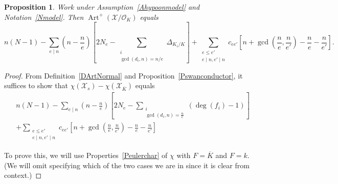 \documentclass[12pt]{amsart}
\numberwithin{equation}{section}
\newtheorem{prop}[equation]{Proposition}
\theoremstyle{definition}
\newcommand{\mc}[1]{\mathcal{#1}}
\DeclareMathOperator{\cha}{char}
\DeclareMathOperator{\Art}{Art}
\begin{document}
\begin{prop}\label{PartinNormalcalculation} Work under Assumption~\ref{Ahypoonmodel} and Notation~\ref{Nmodel}.
  Then $\Art^+(\mc{X}/\mc{O}_K)$ equals
$$ n \left(N-1 \right)-\sum_{e \mid n} \left(n-\frac{n}{e} \right) \left[2N_e -  \sum_{\substack{i \\ \gcd(d_i,n) = n/e}} \Delta_{K_i/K} \right]+\sum_{\substack{e \leq e' \\ e \mid n, e' \mid n}} c_{ee'} \left[ n+\gcd \left(\frac{n}{e},\frac{n}{e'} \right)-\frac{n}{e}-\frac{n}{e'} \right].$$
\end{prop}
\begin{proof}
From Definition~\ref{DArtNormal} and Proposition~\ref{Pswanconductor}, it suffices to show that $\chi(\mc{X}_s)-\chi(\mc{X}_{\overline{K}})$ equals
\begin{equation}\label{Etoprove}
\begin{aligned}
n \left(N-1 \right)-\sum_{e \mid n} \left(n-\frac{n}{e} \right) \left[2N_e -  \sum_{\substack{i \\ \gcd(d_i,n) = \frac{n}{e}}} (\deg(f_i)-1) \right]
\\+\sum_{\substack{e \leq e' \\ e \mid n, e' \mid n}} c_{ee'} \left[ n+\gcd \left(\frac{n}{e},\frac{n}{e'} \right)-\frac{n}{e}-\frac{n}{e'} \right] 
\end{aligned}
\end{equation}

To prove this, we will use Properties~\ref{Peulerchar} of $\chi$ with $F=\overline{K}$ and $F=k$. (We will omit specifying which of the two cases we are in since it is clear from context.)


\end{proof}
\end{document}
